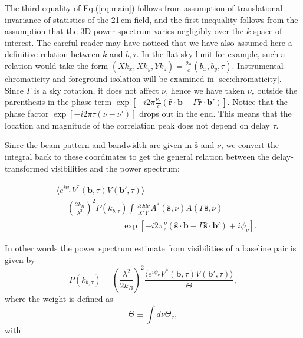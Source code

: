 \documentclass[twocolumn,apj,numberedappendix]{emulateapj}
\renewcommand\[{\begin{equation}}
\renewcommand\]{\end{equation}}
\begin{document}
The third equality of Eq.(\ref{eq:main}) follows from assumption of translational invariance of statistics of the 21\,cm field, and the first inequality follows from the assumption that
the 3D power spectrum varies negligibly over the $k$-space of interest. The careful reader may have noticed that we have also assumed here a definitive relation between $k$ and $b,\tau$. In the flat-sky limit for example, such a relation would take the form $(Xk_{x},Xk_{y},Yk_{z})=\frac{2\pi}{c}(b_{x},b_{y},\tau)$. Instrumental chromaticity and foreground isolation will be examined in \ref{sec:chromaticity}. Since $\Gamma$
is a sky rotation, it does not affect $\nu$, hence we have taken $\nu_{r}$
outside the parenthesis in the phase term $\exp\left[-i2\pi\frac{\nu_{r}}{c}\left(\hat{\boldsymbol{r}}\cdot\boldsymbol{b}-\Gamma \hat{\boldsymbol{r}}\cdot\boldsymbol{b'}\right)\right]$. Notice that the phase factor $\exp\left[-i2\pi\tau\left(\nu-\nu'\right)\right]$
drops out in the end. This means that the location and magnitude of the correlation peak does not depend on delay $\tau$. 

Since the beam pattern and bandwidth are given in $\hat{\boldsymbol{s}}$
and $\nu$, we convert the integral back to these coordinates to get
the general relation between the delay-transformed visibilities and
the power spectrum:

\begin{equation}
\begin{aligned} & \langle e^{i\psi_{\nu}} V^{*}(\boldsymbol{b},\tau)V(\boldsymbol{b'},\tau)\rangle\\
 & =\left(\frac{2k_{B}}{\lambda^{2}}\right)^{2}P(k_{b,\tau})\int\frac{d\Omega d\nu}{X^{2}Y}A^{*}(\hat{\boldsymbol{s}},\nu)A(\Gamma\hat{\boldsymbol{s}},\nu)\\
 & \qquad \qquad \qquad \qquad \exp\left[-i2\pi\frac{\nu}{c}\left(\hat{\boldsymbol{s}}\cdot\boldsymbol{b}-\Gamma\hat{\boldsymbol{s}}\cdot\boldsymbol{b'}\right)+i\psi_{\nu}\right].
 \end{aligned}
\label{eq:final}
\end{equation}

In other words the power spectrum estimate from visibilities of a baseline pair is given by 
\begin{equation}
 P(k_{b,\tau}) = \left(\frac{\lambda^{2}}{2k_{B}}\right)^{2} \frac{\langle e^{i\psi_{\nu}} V^{*}(\boldsymbol{b},\tau)V(\boldsymbol{b'},\tau)\rangle}{\Theta}, 
 \label{eq:opp}
\end{equation}
where the weight is defined as 
\begin{equation}
\Theta \equiv\int d\nu \Theta_{\nu}, 
\label{eq:Theta}
\end{equation}
with  
\end{document}
